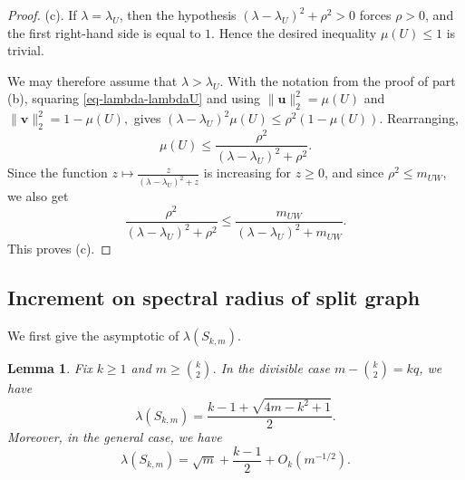 \documentclass[10pt,a4paper]{amsart}
\newtheorem{lemma}[theorem]{Lemma}
\begin{document}
\begin{proof}
\smallskip
\noindent\textup{(c).}
If \(\lambda=\lambda_U\), then the hypothesis
\((\lambda-\lambda_U)^2+\rho^2>0\) forces \(\rho>0\), and the first
right-hand side is equal to \(1\).  Hence the desired inequality
\(\mu(U)\le 1\) is trivial.

We may therefore assume that \(\lambda>\lambda_U\).  With the notation
from the proof of part \textup{(b)}, squaring \eqref{eq-lambda-lambdaU}
and using $\|\bm{u}\|_2^2=\mu(U)$ and  $\|\bm{v}\|_2^2=1-\mu(U),$
gives $(\lambda-\lambda_U)^2\mu(U)
        \le
        \rho^2(1-\mu(U)).$ Rearranging,
\[
        \mu(U)
        \le
        \frac{\rho^2}{(\lambda-\lambda_U)^2+\rho^2}.
\]
Since the function $z\mapsto \frac{z}{(\lambda-\lambda_U)^2+z}$ is increasing for \(z\ge 0\), and since \(\rho^2\le m_{UW}\), we also get
\[
        \frac{\rho^2}{(\lambda-\lambda_U)^2+\rho^2}
        \le
        \frac{m_{UW}}{(\lambda-\lambda_U)^2+m_{UW}}.
\]
This proves (c).
\end{proof}


\subsection{Increment on spectral radius of split graph}

We first give the asymptotic of $\lambda(S_{k,m})$.

\begin{lemma}\label{lem:Skm-asymptotic-lambda}
Fix $k\ge 1$ and $m\ge \binom{k}{2}$. In the divisible case $m-\binom{k}{2}=kq$, we have
\begin{equation}\label{eq:Skm-lambda-divisible}
  \lambda(S_{k,m})
  =
  \frac{k-1+\sqrt{4m-k^2+1}}{2}.
\end{equation} 
Moreover, in the general case, we have
\begin{equation}\label{eq:Skm-lambda-asymptotic}
  \lambda(S_{k,m}) = \sqrt m+\frac{k-1}{2}+O_k(m^{-1/2}).
\end{equation}
\end{lemma}
\end{document}
